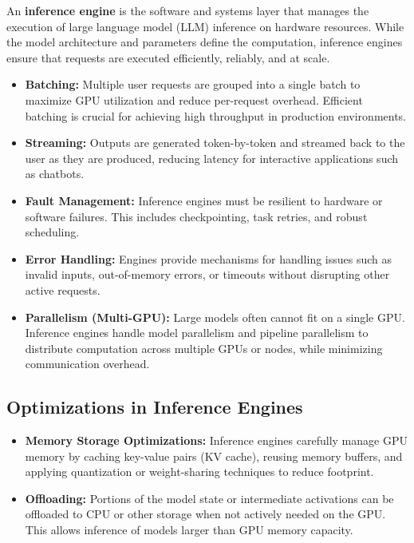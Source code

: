 An \textbf{inference engine} is the software and systems layer that manages the execution of large language model (LLM) inference on hardware resources. While the model architecture and parameters define the computation, inference engines ensure that requests are executed efficiently, reliably, and at scale. 
\begin{itemize}
    \item \textbf{Batching:}  
    Multiple user requests are grouped into a single batch to maximize GPU utilization and reduce per-request overhead. Efficient batching is crucial for achieving high throughput in production environments.
    
    \item \textbf{Streaming:}  
    Outputs are generated token-by-token and streamed back to the user as they are produced, reducing latency for interactive applications such as chatbots.
    
    \item \textbf{Fault Management:}  
    Inference engines must be resilient to hardware or software failures. This includes checkpointing, task retries, and robust scheduling.
    
    \item \textbf{Error Handling:}  
    Engines provide mechanisms for handling issues such as invalid inputs, out-of-memory errors, or timeouts without disrupting other active requests.
    
    \item \textbf{Parallelism (Multi-GPU):}  
    Large models often cannot fit on a single GPU. Inference engines handle model parallelism and pipeline parallelism to distribute computation across multiple GPUs or nodes, while minimizing communication overhead.
\end{itemize}

\subsection{Optimizations in Inference Engines}
\begin{itemize}
    \item \textbf{Memory Storage Optimizations:}  
    Inference engines carefully manage GPU memory by caching key-value pairs (KV cache), reusing memory buffers, and applying quantization or weight-sharing techniques to reduce footprint.
    
    \item \textbf{Offloading:}  
    Portions of the model state or intermediate activations can be offloaded to CPU or other storage when not actively needed on the GPU. This allows inference of models larger than GPU memory capacity.
\end{itemize}


